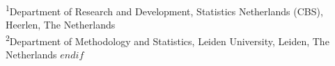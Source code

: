 
{\footnotesize \textsuperscript{1}Department of Research and Development, Statistics Netherlands (CBS), Heerlen, The Netherlands \\
\textsuperscript{2}Department of Methodology and Statistics, Leiden University, Leiden, The Netherlands} 
$endif$


